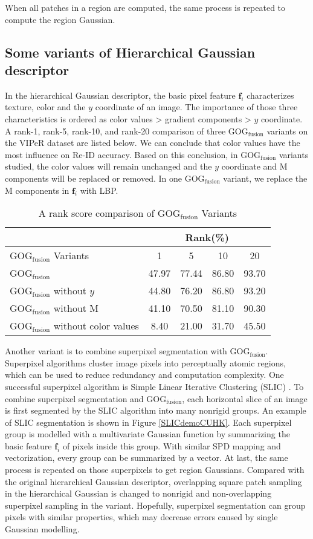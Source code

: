 When all patches in a region are computed, the same process is repeated to compute the region Gaussian. 
\subsection{Some variants of Hierarchical Gaussian descriptor}
In the hierarchical Gaussian descriptor, the basic pixel feature $\bm{f}_i$ characterizes texture, color and the $y$ coordinate of an image. The importance of those three characteristics is ordered as color values > gradient components > $y$ coordinate. A rank-1, rank-5, rank-10, and rank-20 comparison of three GOG$_\text{fusion}$ variants on the VIPeR dataset are listed below. We can conclude that color values have the most influence on Re-ID accuracy. Based on this conclusion, in GOG$_\text{fusion}$ variants studied, the color values will remain unchanged and the $y$ coordinate and M components will be replaced or removed. In one GOG$_\text{fusion}$ variant, we replace the M components in $\bm{f}_i$ with LBP. 

\begin{table}[H]
\centering
\caption{A rank score comparison of GOG$_\text{fusion}$ Variants}
\begin{tabular}{|l|c|c|c|c|}
\hline
 & \multicolumn{4}{|c|}{Rank(\%)}\\
\hline
GOG$_\text{fusion}$ Variants & 1 & 5 & 10 & 20 \\ 
\hline
GOG$_\text{fusion}$ &47.97 &77.44 & 86.80& 93.70\\
\hline
GOG$_\text{fusion}$ without $y$ & 44.80&  76.20& 86.80& 93.20\\
\hline
GOG$_\text{fusion}$ without M & 41.10&70.50&81.10&90.30\\
\hline
GOG$_\text{fusion}$ without color values & 8.40 &21.00&31.70& 45.50\\
\hline
\end{tabular}
\end{table}

Another variant is to combine superpixel segmentation with GOG$_\text{fusion}$. Superpixel algorithms cluster image pixels into perceptually atomic regions, which can be used to reduce redundancy and computation complexity. One successful superpixel algorithm is Simple Linear Iterative Clustering (SLIC) \cite{SLIC}. To combine superpixel segmentation and GOG$_\text{fusion}$, each horizontal slice of an image is first segmented by the SLIC algorithm into many nonrigid groups. An example of SLIC segmentation is shown in Figure \ref{SLICdemoCUHK}. Each superpixel group is modelled with a multivariate Gaussian function by summarizing the basic feature $\bm{f}_i$ of pixels inside this group. With similar SPD mapping and vectorization, every group can be summarized by a vector. At last, the same process is repeated on those superpixels to get region Gaussians. Compared with the original hierarchical Gaussian descriptor, overlapping square patch sampling in the hierarchical Gaussian is changed to nonrigid and non-overlapping superpixel sampling in the variant. Hopefully, superpixel segmentation can group pixels with similar properties, which may decrease errors caused by single Gaussian modelling. 

